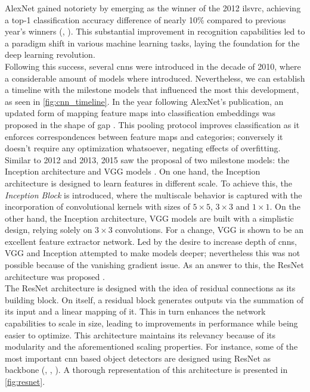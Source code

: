 AlexNet gained notoriety by emerging as the winner of the 2012 \gls{ilsvrc}, achieving a top-1 
classification accuracy difference of nearly 10\% compared to previous year's winners 
(\cite{berg2010large}, \cite{sanchez2011high}). This substantial improvement in recognition 
capabilities led to a paradigm shift in various machine learning tasks, laying the foundation 
for the deep learning revolution.\\

\noindent Following this success, several \glspl{cnn} were introduced in the decade of 2010, where 
a considerable amount of models where introduced. Nevertheless, we can establish a timeline with the 
milestone models that influenced the most this development, as seen in \autoref{fig:cnn_timeline}.
In the year following AlexNet's publication, an updated form of mapping feature maps into 
classification embeddings was proposed  in the shape of \gls{gap} \autocite{lin2013network}. 
This pooling protocol improves classification as it enforces correspondences between feature maps 
and categories; conversely it doesn't require any optimization whatsoever, negating effects of 
overfitting.\\ 

\noindent Similar to 2012 and 2013, 2015 saw the proposal of two milestone models: the Inception 
architecture \autocite{szegedy2015going} and VGG models \autocite{simonyan2015deep}. On one hand, 
the Inception architecture is designed to learn features in different scale. To achieve this, the 
\emph{Inception Block} is introduced, where the multiscale behavior is captured with the 
incorporation of convolutional kernels with sizes of $5\times5$, $3\times 3$ and $1\times1$. On the 
other hand, the Inception architecture, VGG models are built with a simplistic design, relying 
solely on $3\times 3$ convolutions. For a change, VGG is shown to be an excellent feature extractor 
network. Led by the desire to increase depth of \glspl{cnn}, VGG and Inception attempted to make 
models deeper; nevertheless this was not possible because of the vanishing gradient issue. As an 
answer to this, the ResNet architecture was proposed \autocite{he2016deep}.\\



%
\noindent The ResNet architecture is designed with the idea of residual connections as its 
building block. On itself, a residual block generates outputs via the summation of its input and a 
linear mapping of it. This in turn enhances the network capabilities to scale in size, leading to 
improvements in performance while being easier to optimize. This architecture maintains its 
relevancy because of its modularity and the aforementioned scaling properties. For instance, some 
of the most important \gls{cnn} based object detectors are designed using ResNet as backbone 
(\cite{ren2015faster}, \cite{lin2017focal}, \cite{he2017mask}). A thorough representation of this 
architecture is presented in \autoref{fig:resnet}. \\

